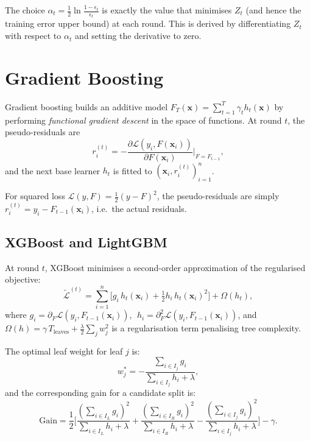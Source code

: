 \begin{remark}
The choice $\alpha_t=\frac{1}{2}\ln\frac{1-\epsilon_t}{\epsilon_t}$ is exactly the value that minimises $Z_t$ (and hence the training error upper bound) at each round. This is derived by differentiating $Z_t$ with respect to $\alpha_t$ and setting the derivative to zero.
\end{remark}

\section{Gradient Boosting}

\begin{definition}
Gradient boosting builds an additive model $F_T(\bm{x})=\sum_{t=1}^T \gamma_t h_t(\bm{x})$ by performing \emph{functional gradient descent} in the space of functions. At round $t$, the pseudo-residuals are
\[
  r_i^{(t)} = -\frac{\partial \mathcal{L}(y_i, F(\bm{x}_i))}{\partial F(\bm{x}_i)}\bigg|_{F=F_{t-1}},
\]
and the next base learner $h_t$ is fitted to $({\bm{x}_i, r_i^{(t)}})_{i=1}^n$.
\end{definition}

For squared loss $\mathcal{L}(y,F)=\frac{1}{2}(y-F)^2$, the pseudo-residuals are simply $r_i^{(t)}=y_i - F_{t-1}(\bm{x}_i)$, i.e.\ the actual residuals.

\subsection{XGBoost and LightGBM}

\begin{keyformulas}[title=\textbf{XGBoost Objective}]
At round $t$, XGBoost minimises a second-order approximation of the regularised objective:
\[
  \tilde{\mathcal{L}}^{(t)} = \sum_{i=1}^n \bigl[g_i\, h_t(\bm{x}_i) + \tfrac{1}{2}h_i\, h_t(\bm{x}_i)^2\bigr]
  + \Omega(h_t),
\]
where $g_i=\partial_{F}\mathcal{L}(y_i,F_{t-1}(\bm{x}_i))$, $\;h_i=\partial_{F}^2\mathcal{L}(y_i,F_{t-1}(\bm{x}_i))$, and $\Omega(h)=\gamma\, T_{\text{leaves}} + \frac{\lambda}{2}\sum_j w_j^2$ is a regularisation term penalising tree complexity.

The optimal leaf weight for leaf $j$ is:
\[
  w_j^* = -\frac{\sum_{i\in I_j} g_i}{\sum_{i\in I_j} h_i + \lambda},
\]
and the corresponding gain for a candidate split is:
\[
  \text{Gain} = \frac{1}{2}\Biggl[\frac{(\sum_{i\in I_L}g_i)^2}{\sum_{i\in I_L}h_i+\lambda}
  + \frac{(\sum_{i\in I_R}g_i)^2}{\sum_{i\in I_R}h_i+\lambda}
  - \frac{(\sum_{i\in I_j}g_i)^2}{\sum_{i\in I_j}h_i+\lambda}\Biggr] - \gamma.
\]
\end{keyformulas}

